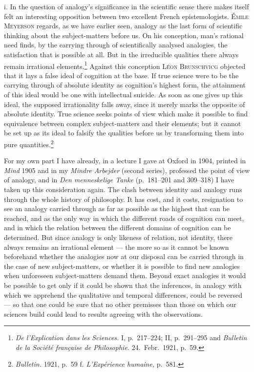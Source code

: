 \documentclass[12pt]{book}
\newcommand{\opage}[1]{\marginnote{\footnotesize\textit{[#1]}}}
\begin{document}
i. In the question of analogy's significance in the scientific sense there makes
itself felt an interesting opposition between two excellent French epistemologists.
\textsc{Émile Meyerson} regards, as we have earlier seen, analogy as the last form
of scientific thinking about the subject-matters before us. On his conception,
man's rational need finds, by the carrying through of scientifically analysed
analogies, the satisfaction that is possible at all. But in the irreducible
qualities there always remain irrational
elements.\footnote{\textit{De l'Explication dans les Sciences.} I, p.\ 217--224;
II, p.\ 291--295 and \textit{Bulletin de la Société française de Philosophie.} 24.\
Febr.\ 1921, p.\ 59.} Against this conception \textsc{Léon Brunschvicg} objected
that it lays a false ideal of cognition at the base. If true science were to be the
carrying through of absolute identity as \opage{108}cognition's highest form, the attainment
of this ideal would be one with intellectual suicide. As soon as one gives up this
ideal, the supposed irrationality falls away, since it merely marks the opposite of
absolute identity. True science seeks points of view which make it possible to find
equivalence between complex subject-matters and their elements; but it cannot be
set up as its ideal to falsify the qualities before us by transforming them into
pure quantities.\footnote{\textit{Bulletin.} 1921, p.\ 59 f.
\textit{L'Expérience humaine,} p.\ 581.}

For my own part I have already, in a lecture I gave at Oxford in 1904, printed in
\textit{Mind} 1905 and in my \textit{Mindre Arbejder} (second series), professed
the point of view of analogy, and in \textit{Den menneskelige Tanke} (p.\ 181--201
and 309--318) I have taken up this consideration again. The clash between identity
and analogy runs through the whole history of philosophy. It has cost, and it
costs, resignation to see an analogy carried through as far as possible as the
highest that can be reached, and as the only way in which the different roads of
cognition can meet, and in which the relation between the different domains of
cognition can be determined. But since analogy is only likeness of relation, not
identity, there always remains an irrational element --- the more so as it cannot
be known beforehand whether the analogies now at our disposal can be carried
through in the case of new subject-matters, or whether it is possible to find new
analogies when unforeseen subject-matters demand them. Beyond exact analogies it
would be possible to get only if it could be shown that the inferences, in analogy
with which we apprehend the qualitative and temporal differences, could be
reversed --- so that one could be sure that no other premisses than those on which
our \opage{109}sciences build could lead to results agreeing with the observations.
\end{document}
